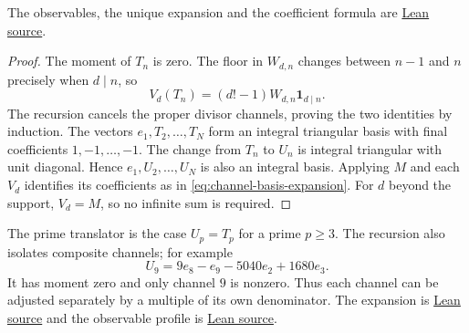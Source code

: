 \documentclass[11pt]{article}
\begin{document}
\noindent The observables, the unique expansion and the coefficient formula are
\href{https://github.com/wcook04/plectis-erdos/blob/f36a98bf3d3e6f65f1074e3b800e3293d5b8a51a/ErdosProblems/Erdos68/PaperCompleteDivisorCoordinates.lean#L260}{Lean source}.
\begin{proof}
The moment of $T_n$ is zero.  The floor in $W_{d,n}$ changes between
$n-1$ and $n$ precisely when $d\mid n$, so
\[
V_d(T_n)=(d!-1)W_{d,n}\mathbf1_{d\mid n}.
\]
The recursion cancels the proper divisor channels, proving the two identities
by induction.  The vectors $e_1,T_2,\ldots,T_N$ form an integral triangular
basis with final coefficients $1,-1,\ldots,-1$.  The change from $T_n$ to
$U_n$ is integral triangular with unit diagonal.  Hence $e_1,U_2,\ldots,U_N$
is also an integral basis.  Applying $M$ and each $V_d$ identifies its
coefficients as in \eqref{eq:channel-basis-expansion}.  For $d$ beyond the
support, $V_d=M$, so no infinite sum is required.
\end{proof}

The prime translator is the case $U_p=T_p$ for a prime $p\ge3$.
The recursion also isolates composite channels; for example
\begin{equation}
U_9=9e_8-e_9-5040e_2+1680e_3.
\label{res:translator}
\end{equation}
It has moment zero and only channel $9$ is nonzero.  Thus each channel can
be adjusted separately by a multiple of its own denominator.  The expansion
is \href{https://github.com/wcook04/plectis-erdos/blob/f36a98bf3d3e6f65f1074e3b800e3293d5b8a51a/ErdosProblems/Erdos68/PaperCompleteSupplementary.lean#L17}{Lean source} and the observable
profile is \href{https://github.com/wcook04/plectis-erdos/blob/f36a98bf3d3e6f65f1074e3b800e3293d5b8a51a/ErdosProblems/Erdos68/PaperCompleteSupplementary.lean#L45}{Lean source}.
\end{document}
